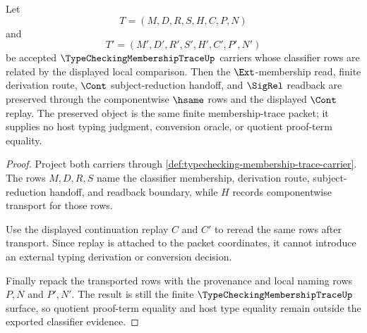 \begin{theorem}
\label{thm:typechecking-membership-trace-classifier-stability}
Let
$$
T=(M,D,R,S,H,C,P,N)
$$
and
$$
T'=(M',D',R',S',H',C',P',N')
$$
be accepted $\TypeCheckingMembershipTraceUp$ carriers whose classifier rows are related by the displayed local comparison. Then the $\Ext$-membership read, finite derivation route, $\Cont$ subject-reduction handoff, and $\SigRel$ readback are preserved through the componentwise $\hsame$ rows and the displayed $\Cont$ replay. The preserved object is the same finite membership-trace packet; it supplies no host typing judgment, conversion oracle, or quotient proof-term equality.
\end{theorem}
\begin{proof}
Project both carriers through \autoref{def:typechecking-membership-trace-carrier}. The rows $M,D,R,S$ name the classifier membership, derivation route, subject-reduction handoff, and readback boundary, while $H$ records componentwise transport for those rows.

Use the displayed continuation replay $C$ and $C'$ to reread the same rows after transport. Since replay is attached to the packet coordinates, it cannot introduce an external typing derivation or conversion decision.

Finally repack the transported rows with the provenance and local naming rows $P,N$ and $P',N'$. The result is still the finite $\TypeCheckingMembershipTraceUp$ surface, so quotient proof-term equality and host type equality remain outside the exported classifier evidence.
\end{proof}

